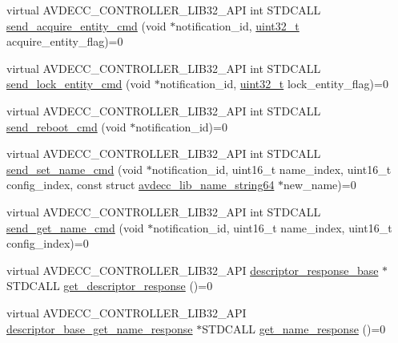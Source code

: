 \begin{DoxyCompactItemize}
\item 
virtual A\+V\+D\+E\+C\+C\+\_\+\+C\+O\+N\+T\+R\+O\+L\+L\+E\+R\+\_\+\+L\+I\+B32\+\_\+\+A\+PI int S\+T\+D\+C\+A\+LL \hyperlink{classavdecc__lib_1_1descriptor__base_adfd0cf2a51bff7d762b0efc743480c48}{send\+\_\+acquire\+\_\+entity\+\_\+cmd} (void $\ast$notification\+\_\+id, \hyperlink{parse_8c_a6eb1e68cc391dd753bc8ce896dbb8315}{uint32\+\_\+t} acquire\+\_\+entity\+\_\+flag)=0
\item 
virtual A\+V\+D\+E\+C\+C\+\_\+\+C\+O\+N\+T\+R\+O\+L\+L\+E\+R\+\_\+\+L\+I\+B32\+\_\+\+A\+PI int S\+T\+D\+C\+A\+LL \hyperlink{classavdecc__lib_1_1descriptor__base_a1ac1f5c700f4eebd37b7c45498b36bbc}{send\+\_\+lock\+\_\+entity\+\_\+cmd} (void $\ast$notification\+\_\+id, \hyperlink{parse_8c_a6eb1e68cc391dd753bc8ce896dbb8315}{uint32\+\_\+t} lock\+\_\+entity\+\_\+flag)=0
\item 
virtual A\+V\+D\+E\+C\+C\+\_\+\+C\+O\+N\+T\+R\+O\+L\+L\+E\+R\+\_\+\+L\+I\+B32\+\_\+\+A\+PI int S\+T\+D\+C\+A\+LL \hyperlink{classavdecc__lib_1_1descriptor__base_a1618412a9b3d57a12044030b31cfd5a3}{send\+\_\+reboot\+\_\+cmd} (void $\ast$notification\+\_\+id)=0
\item 
virtual A\+V\+D\+E\+C\+C\+\_\+\+C\+O\+N\+T\+R\+O\+L\+L\+E\+R\+\_\+\+L\+I\+B32\+\_\+\+A\+PI int S\+T\+D\+C\+A\+LL \hyperlink{classavdecc__lib_1_1descriptor__base_a6a8c227d7a202f251c689107df7ede0b}{send\+\_\+set\+\_\+name\+\_\+cmd} (void $\ast$notification\+\_\+id, uint16\+\_\+t name\+\_\+index, uint16\+\_\+t config\+\_\+index, const struct \hyperlink{structavdecc__lib_1_1avdecc__lib__name__string64}{avdecc\+\_\+lib\+\_\+name\+\_\+string64} $\ast$new\+\_\+name)=0
\item 
virtual A\+V\+D\+E\+C\+C\+\_\+\+C\+O\+N\+T\+R\+O\+L\+L\+E\+R\+\_\+\+L\+I\+B32\+\_\+\+A\+PI int S\+T\+D\+C\+A\+LL \hyperlink{classavdecc__lib_1_1descriptor__base_a27ba9959456de53a8de18eead74806f7}{send\+\_\+get\+\_\+name\+\_\+cmd} (void $\ast$notification\+\_\+id, uint16\+\_\+t name\+\_\+index, uint16\+\_\+t config\+\_\+index)=0
\item 
virtual A\+V\+D\+E\+C\+C\+\_\+\+C\+O\+N\+T\+R\+O\+L\+L\+E\+R\+\_\+\+L\+I\+B32\+\_\+\+A\+PI \hyperlink{classavdecc__lib_1_1descriptor__response__base}{descriptor\+\_\+response\+\_\+base} $\ast$S\+T\+D\+C\+A\+LL \hyperlink{classavdecc__lib_1_1descriptor__base_ac64e6a5ee8781eeb9c781953e845b1be}{get\+\_\+descriptor\+\_\+response} ()=0
\item 
virtual A\+V\+D\+E\+C\+C\+\_\+\+C\+O\+N\+T\+R\+O\+L\+L\+E\+R\+\_\+\+L\+I\+B32\+\_\+\+A\+PI \hyperlink{classavdecc__lib_1_1descriptor__base__get__name__response}{descriptor\+\_\+base\+\_\+get\+\_\+name\+\_\+response} $\ast$S\+T\+D\+C\+A\+LL \hyperlink{classavdecc__lib_1_1descriptor__base_aba4bf8a81f90f5bf00d5c8b5a7330145}{get\+\_\+name\+\_\+response} ()=0

\end{DoxyCompactItemize}
